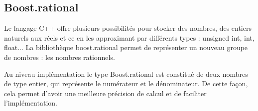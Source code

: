 
\subsection*{Boost.rational}

Le langage C++ offre plusieurs possibilités pour stocker des nombres, des entiers naturels aux réels et ce en les approximant par différents types : unsigned int, int, float... La bibliothèque boost.rational permet de représenter un nouveau groupe de nombres : les nombres rationnels.

Au niveau implémentation le type Boost.rational est constitué de deux nombres de type entier, qui représente le numérateur et le dénominateur. De cette façon, cela permet d'avoir une meilleure précision de calcul et de faciliter l'implémentation.


